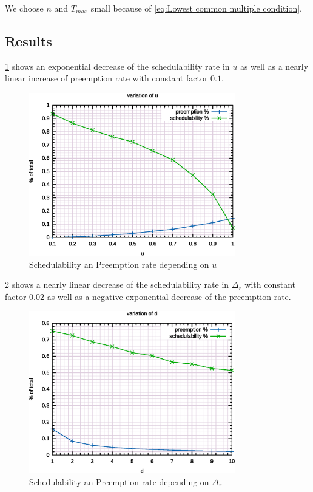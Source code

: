 \documentclass[a4paper,12pt]{article}
\begin{document}
We choose $n$ and $T_{max}$ small because of \ref{eq:Lowest common multiple condition}.


\subsection{Results}



\ref{fig:stu:au} shows an exponential decrease of the schedulability rate in $u$ as well as a nearly linear increase of preemption rate with constant factor $0.1$.

\begin{figure}
	\centering
	\includegraphics[width=0.8\textwidth]{../gnuplot/eps/1}
	\caption{\label{fig:stu:au} Schedulability an Preemption rate depending on $u$}
\end{figure}


\ref{fig:stu:ad} shows a nearly linear decrease of the schedulability rate in $\Delta_r$ with constant factor $0.02$ as well as a negative exponential decrease of the preemption rate.

\begin{figure}
	\centering
	\includegraphics[width=0.8\textwidth]{../gnuplot/eps/2}
	\caption{\label{fig:stu:ad} Schedulability an Preemption rate depending on $\Delta_r$}
\end{figure}
\end{document}
